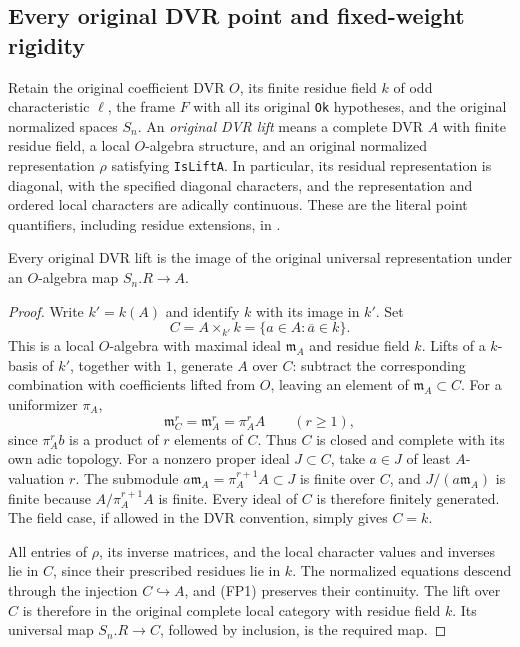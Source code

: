 \subsection{Every original DVR point and fixed-weight rigidity}
\label{sec:support-finite-points}

Retain the original coefficient DVR $O$, its finite residue field $k$
of odd characteristic $\ell$, the frame $F$ with all its original
\texttt{Ok} hypotheses, and the original normalized spaces $S_n$.
An \emph{original DVR lift} means a complete DVR $A$ with finite
residue field, a local $O$-algebra structure, and an original
normalized representation $\rho$ satisfying \texttt{IsLiftA}.
In particular, its residual representation is diagonal, with the
specified diagonal characters, and the representation and ordered
local characters are adically continuous.  These are the literal
point quantifiers, including residue extensions, in
\cite{support-finite-points-source}.

\begin{lemma}
\label{lem:support-residue-pullback}
Every original DVR lift is the image of the original universal
representation under an $O$-algebra map $S_n.R\to A$.
\end{lemma}

\begin{proof}
Write $k'=k(A)$ and identify $k$ with its image in $k'$.  Set
\[
 C=A\mathbin{\times}_{k'}k
   =\{a\in A:\overline a\in k\}.
\]
This is a local $O$-algebra with maximal ideal $\mathfrak m_A$ and
residue field $k$.  Lifts of a $k$-basis of $k'$, together with $1$,
generate $A$ over $C$: subtract the corresponding combination with
coefficients lifted from $O$, leaving an element of
$\mathfrak m_A\subset C$.  For a uniformizer $\pi_A$,
\[
 \mathfrak m_C^r=\mathfrak m_A^r=\pi_A^rA\qquad(r\geq1),       \tag{FP1}
\]
since $\pi_A^rb$ is a product of $r$ elements of $C$.
Thus $C$ is closed and complete with its own adic topology.
For a nonzero proper ideal $J\subset C$, take $a\in J$ of least
$A$-valuation $r$.  The submodule
$a\mathfrak m_A=\pi_A^{r+1}A\subset J$ is finite over $C$, and
$J/(a\mathfrak m_A)$ is finite because $A/\pi_A^{r+1}A$ is finite.
Every ideal of $C$ is therefore finitely generated.  The field case,
if allowed in the DVR convention, simply gives $C=k$.

All entries of $\rho$, its inverse matrices, and the local character
values and inverses lie in $C$, since their prescribed residues lie
in $k$.  The normalized equations descend through the injection
$C\hookrightarrow A$, and (FP1) preserves their continuity.
The lift over $C$ is therefore in the original complete local
category with residue field $k$.  Its universal map
$S_n.R\to C$, followed by inclusion, is the required map.
\end{proof}

